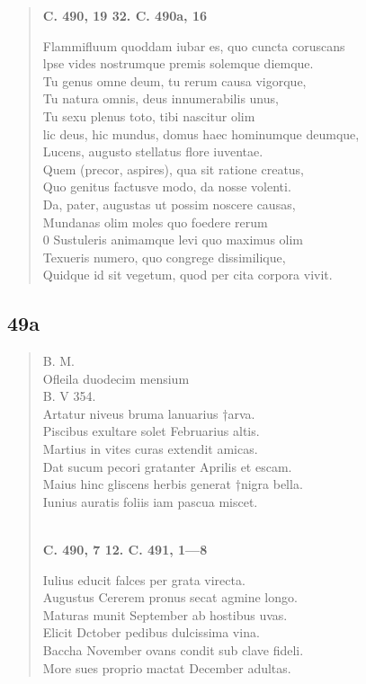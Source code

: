 \documentclass[11pt, a4paper]{report}
\begin{document}
\begin{verse}
    \begin{center} \textbf{C. 490, 19 32. C. 490a, 16} \end{center} \marginpar{[47]} Flammifluum quoddam iubar es, quo cuncta coruscans \\ lpse vides nostrumque premis solemque diemque. \\ Tu genus omne deum, tu rerum causa vigorque, \\ Tu natura omnis, deus innumerabilis unus, \\ Tu sexu plenus toto, tibi nascitur olim \\ lic deus, hic mundus, domus haec hominumque deumque, \\ Lucens, augusto stellatus flore iuventae. \\ Quem (precor, aspires), qua sit ratione creatus, \\ Quo genitus factusve modo, da nosse volenti. \\ Da, pater, augustas ut possim noscere causas, \\ Mundanas olim moles quo foedere rerum \\ 0 Sustuleris animamque levi quo maximus olim \\ Texueris numero, quo congrege dissimilique, \\ Quidque id sit vegetum, quod per cita corpora vivit. \\ 
      \end{verse}
  
            \subsection*{49a}
      \begin{verse}
      B. M. \\ Ofleila duodecim mensium \\ B. V 354. \\ Artatur niveus bruma lanuarius †arva. \\ Piscibus exultare solet Februarius altis. \\ Martius in vites curas extendit amicas. \\ Dat sucum pecori gratanter Aprilis et escam. \\ Maius hinc gliscens herbis generat †nigra bella. \\ Iunius auratis foliis iam pascua miscet. \\ 
        ﻿\pagebreak 
    \begin{center} \textbf{C. 490, 7 12. C. 491, 1—8} \end{center} \marginpar{[48]} Iulius educit falces per grata virecta. \\ Augustus Cererem pronus secat agmine longo. \\ Maturas munit September ab hostibus uvas. \\ Elicit Dctober pedibus dulcissima vina. \\ Baccha November ovans condit sub clave fideli. \\ More sues proprio mactat December adultas. \\ 
      \end{verse}
  
\end{document}
